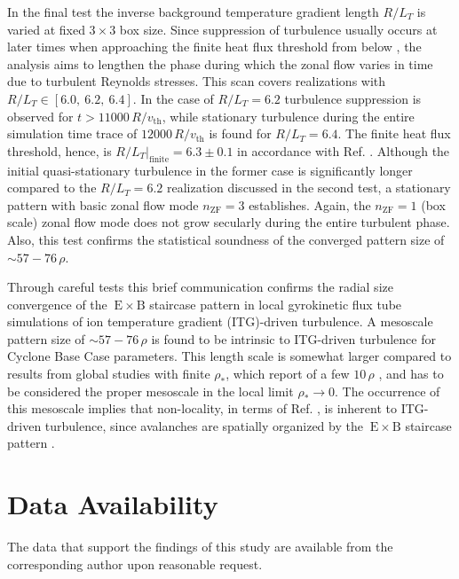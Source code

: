 \documentclass[aip, amsmath, amssymb, reprint, twocolumn, floatfix]{revtex4-1}
\newcommand{\exb}{\mathrm{\:E}\times\mathrm{B}}
\newcommand{\rlt}{R/L_T}
\newcommand{\rhoth}{\rho}
\newcommand{\vth}{v_{\mathrm{th}}}
\newcommand{\nzf}{n_\mathrm{ZF}}
\begin{document}
In the final test the inverse background temperature gradient length $\rlt$ is varied at fixed $3\times3$ box size.
Since suppression of turbulence usually occurs at later times when approaching the finite heat flux threshold from below \cite{Peeters2016}, the analysis aims to lengthen the phase during which the zonal flow varies in time due to turbulent Reynolds stresses.
This scan covers realizations with $\rlt \in [6.0,~6.2,~6.4]$.
In the case of $\rlt = 6.2$ turbulence suppression is observed for $t > 11000\,R/\vth$, while stationary turbulence during the entire simulation time trace of $12000\,R/\vth$ is found for $\rlt = 6.4$.
The finite heat flux threshold, hence, is $\rlt|_\mathrm{finite} = 6.3 \pm 0.1$ in accordance with Ref. .
Although the initial quasi-stationary turbulence in the former case is significantly longer compared to the $\rlt = 6.2$ realization discussed in the second test, a stationary pattern with basic zonal flow mode $\nzf = 3$ establishes. 
Again, the $\nzf = 1$ (box scale) zonal flow mode does not grow secularly during the entire turbulent phase.
Also, this test confirms the statistical soundness of the converged pattern size of $\sim 57 - 76\,\rhoth$.\\ 


\bigskip


Through careful tests this brief communication confirms the radial size convergence of the $\exb$ staircase pattern in local gyrokinetic flux tube simulations of ion temperature gradient (ITG)-driven turbulence.
A mesoscale pattern size of $\sim 57 - 76\,\rhoth$ is found to be intrinsic to ITG-driven turbulence for Cyclone Base Case parameters.
This length scale is somewhat larger compared to results from global studies with finite $\rho_\ast$, which report of a few $10\,\rhoth$ \cite{Pradalier2010}, and has to be considered the proper mesoscale in the local limit $\rho_\ast \rightarrow 0$.  
The occurrence of this mesoscale implies that non-locality, in terms of Ref. , is inherent to ITG-driven turbulence, since avalanches are spatially organized by the $\exb$ staircase pattern \cite{McMillan2009, Pradalier2010, Rath2016, Peeters2016}. 


\section*{Data Availability}
The data that support the findings of this study are available from the corresponding author upon reasonable request. 


\end{document}
